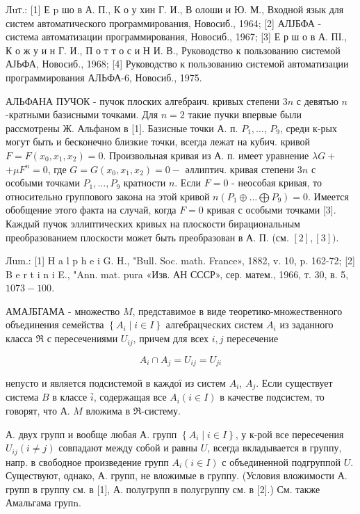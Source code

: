 \documentclass[10pt]{article}
\begin{document}
Лuт.: [1] Е $\mathrm{p}$ шо в А. П., К о у хин Г. И., В олоши и Ю. М., Входной язык для систем автоматического программирования, Новосиб., 1964; [2] АЛЈБФА - система автоматизации программирования, Новосиб., 1967; [3] Е р ш о в А. ПІ., К о ж у и н Г. И., П о т т о с и Н И. В., Руководство к пользованию системой АЈЬФА, Новосиб., 1968; [4] Руководство к пользованию системой автоматизации программирования АЛЬФА-6, Новосиб., 1975.



АЛЬФАНА ПУЧОК - пучок плоских алгебраич. кривых степени $3 n$ с девятью $n$-кратными базисными точками. Для $n=2$ такие пучки впервые были рассмотрены Ж. Альфаном в [1]. Базисные точки А. п. $P_{1}, \ldots$, $P_{9}$, среди к-рых могут быть и бесконечно близкие точки, всегда лежат на кубич. кривой $F=F\left(x_{0}, x_{1}, x_{2}\right)=0$. Произвольная кривая из А. п. имеет уравнение $\lambda G+$ $+\mu F^{n}=0$, где $G=G\left(x_{0}, x_{1}, x_{2}\right)=0-$ әллиптич. кривая степени $3 n$ с особыми точками $P_{1}, \ldots, P_{9}$ кратности $n$. Если $F=0$ - неособая кривая, то относительно группового закона на этой кривой $n\left(P_{1} \oplus \ldots \bigoplus P_{9}\right)=0$. Имеется обобщение этого факта на случай, когда $F=0$ кривая с особыми точками [3]. Каждый пучок эллиптических кривых на плоскости бирациональным преобразованием плоскости может быть преобразован в А. П. (см. $[2],[3])$.



Лum.: [1] H a l p h e i G. H., "Bull. Soc. math. France», 1882, v. 10, p. 162-72; [2] B e r t i n i E., "Ann. mat. pura «Изв. АН СССР», сер. матем., 1966, т. 30, в. 5, $1073-100$.



АМАЈБГАМА - множество $M$, представимое в виде теоретико-множественного объединения семейства $\left\{A_{i} \mid i \in I\right\}$ алгебрацческих систем $A_{i}$ из заданного класса $\Re$ с пересечениями $U_{i j}$, причем для всех $i, j$ пересечение



\[

A_{i} \cap A_{j}=U_{i j}=U_{j i}

\]



непусто и является подсистемой в каждої из систем $A_{i}$, $A_{j}$. Если существует система $B$ в классе $\bar{i}$, содержащая все $A_{i}(i \in I)$ в качестве подсистем, то говорят, что А. $M$ вложима в $\Re$-систему.



А. двух групп и вообще любая А. групп $\left\{A_{i} \mid i \in I\right\}$, у к-рой все пересечения $U_{i j}(i \neq j)$ совпадают между собой и равны $U$, всегда вкладывается в группу, напр. в свободное произведение групп $A_{i}(i \in I)$ с объединенной подгруппой $U$. Существуют, однако, А. групп, не вложимые в группу. (Условия вложимости А. групп в группу см. в [1], А. полугрупп в полугруппу см. в [2].) См. также Амальгама групn.
\end{document}
